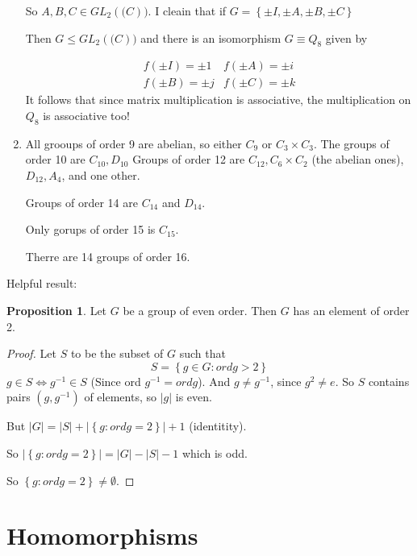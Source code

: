 \documentclass{article}
\theoremstyle{definition}
\newtheorem{proposition}{Proposition}
\begin{document}
\begin{enumerate}
  So $A,B,C \in GL_2(\mathbb(C))$. I cleain that if $G = \left\{ \pm I, \pm A, \pm B, \pm C \right\}$

  Then $G \leq GL_2(\mathbb(C))$ and there is an isomorphism $G \equiv Q_8$ given by 

  \begin{equation}
    \begin{matrix}
      f(\pm I ) = \pm 1 & f(\pm A) = \pm i \\
      f(\pm B ) = \pm j & f(\pm C ) = \pm k
    \end{matrix}
    \label{}
  \end{equation}
  It follows that since matrix multiplication is associative, the multiplication on $Q_8$ is associative too!

\item All grooups of order 9 are abelian, so either $C_9$ or $C_3 \times C_3$.
  The groups of order 10 are $C_{10},D_{10}$ Groups of order 12 are $C_{12}, C_{6} \times C_2$ (the abelian ones), $D_{12},A_{4}$, and one other. 

  Groups of order 14 are $C_{14}$ and $D_{14}$. 

  Only gorups of order 15 is $C_{15}$.

  Therre are 14 groups of order 16.
\end{enumerate}

Helpful result:
\begin{proposition}
  Let $G$ be a group of even order. Then $G$ has an element of order 2.
\end{proposition}

\begin{proof}
  Let $S$ to be the subset of $G$ such that 
  \begin{equation}
    S = \left\{ g \in G : ord g > 2 \right\}
    \label{}
  \end{equation}
  $g \in S \iff g^{-1} \in S$ (Since ord $g^{-1} = ord g$). And $g \neq g^{-1}$, since $g^2 \neq e$. So $S$ contains pairs $(g,g^{-1})$ of elements, so $|g|$ is even. 

  But $|G|=|S| + |\left\{ g : ord g=2 \right\}| + 1$ (identitity). 

  So $|\left\{ g : ord g = 2 \right\}|=|G|-|S|-1$ which is odd. 

  So $\left\{ g : ord g = 2 \right\} \neq \emptyset.$

\end{proof}


\section{Homomorphisms}
\end{document}

